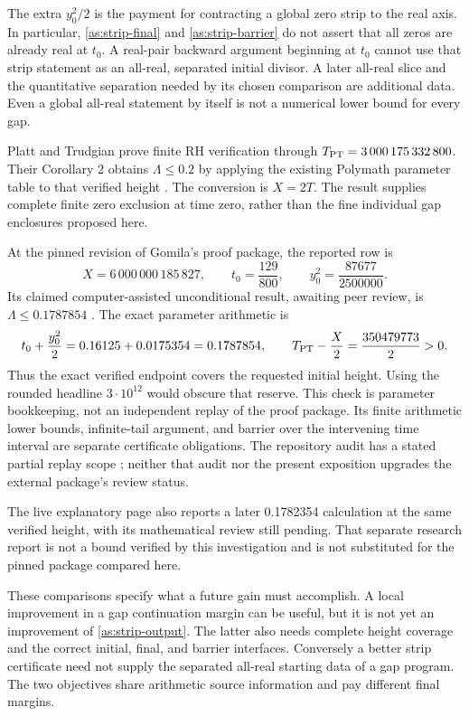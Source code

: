 The extra $y_0^2/2$ is the payment for contracting a global zero strip
to the real axis.  In particular, \eqref{as:strip-final} and
\eqref{as:strip-barrier} do not assert that all zeros are already real
at $t_0$.  A real-pair backward argument beginning at $t_0$ cannot use
that strip statement as an all-real, separated initial divisor.  A later
all-real slice and the quantitative separation needed by its chosen
comparison are additional data.  Even a global all-real statement by
itself is not a numerical lower bound for every gap.

Platt and Trudgian prove finite RH verification through
$T_{\rm PT}=3\,000\,175\,332\,800$.  Their Corollary 2 obtains
$\Lambda\le0.2$ by applying the existing Polymath parameter table to
that verified height \cite{PlattTrudgian2021}.  The conversion is $X=2T$.
The result supplies complete finite zero exclusion at time zero, rather
than the fine individual gap enclosures proposed here.

At the pinned revision of Gomila's proof package, the reported row is
\begin{equation}
 X=6\,000\,000\,185\,827,\qquad t_0=\frac{129}{800},\qquad
 y_0^2=\frac{87677}{2500000}.
 \label{as:gomila-row}
\end{equation}
Its claimed computer-assisted unconditional result, awaiting peer
review, is $\Lambda\le0.1787854$ \cite{Gomila2026Proof}.  The exact
parameter arithmetic is
\begin{equation}
 t_0+\frac{y_0^2}{2}=0.16125+0.0175354=0.1787854,
 \qquad
 T_{\rm PT}-\frac X2=\frac{350479773}{2}>0.
 \label{as:gomila-arithmetic}
\end{equation}
Thus the exact verified endpoint covers the requested initial height.
Using the rounded headline $3\cdot10^{12}$ would obscure that reserve.
This check is parameter bookkeeping, not an independent replay of the
proof package.  Its finite arithmetic lower bounds, infinite-tail
argument, and barrier over the intervening time interval are separate
certificate obligations.  The repository audit has a stated partial
replay scope \cite{NewmanCertificateAudit}; neither that audit nor the
present exposition upgrades the external package's review status.

The live explanatory page \cite{Gomila2026Blog} also reports a later
0.1782354 calculation at the same verified height, with its mathematical
review still pending. That separate research report is not a bound
verified by this investigation and is not substituted for the pinned
package compared here.

These comparisons specify what a future gain must accomplish.  A local
improvement in a gap continuation margin can be useful, but it is not
yet an improvement of \eqref{as:strip-output}.  The latter also needs
complete height coverage and the correct initial, final, and barrier
interfaces.  Conversely a better strip certificate need not supply the
separated all-real starting data of a gap program.  The two objectives
share arithmetic source information and pay different final margins.
